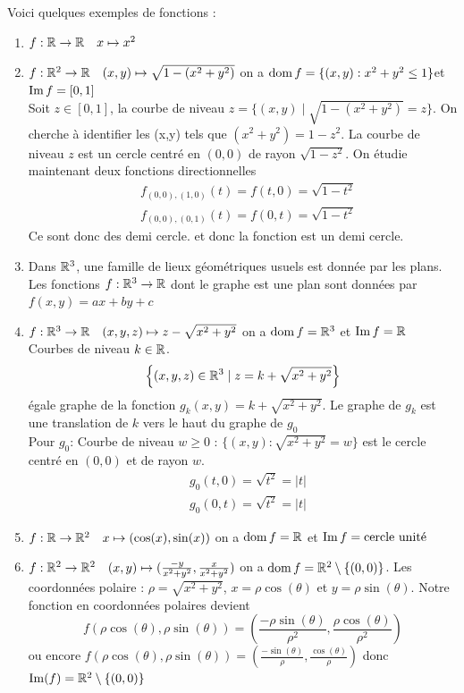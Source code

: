     \begin{exemple}
        Voici quelques exemples de fonctions :
        \begin{enumerate}
            \item $f:\mathbb{R}\to\mathbb{R} \quad x\mapsto x^2$
            \item $f:\mathbb{R}^2\to \mathbb{R} \quad (x,y)\mapsto \sqrt{1-(x^2+y^2)}$ on a $\operatorname{dom} f = \{(x,y):x^2+y^2 \leq 1\}$et $\operatorname{Im} f = [0,1]$\\
            Soit $z\in [0,1]$, la courbe de niveau $z = \{(x,y)\mid \sqrt{1-(x^2+y^2)}=z\}$. On cherche à identifier les (x,y) tels que $(x^2+y^2)=1-z^2$. La courbe de niveau $z$ est un cercle centré en $(0,0)$ de rayon $\sqrt{1-z^2}$. On étudie maintenant deux fonctions directionnelles 
            \begin{align*}
                &f_{(0,0),(1,0)}(t)= f(t,0)=\sqrt{1-t^2}\\
                &f_{(0,0),(0,1)}(t) = f(0,t)=\sqrt{1-t^2}
            \end{align*}
            Ce sont donc des demi cercle. et donc la fonction est un demi cercle.
            \item Dans $\mathbb{R}^3$, une famille de lieux géométriques usuels est donnée par les plans. Les fonctions $f:\mathbb{R}^3\to \mathbb{R}$ dont le graphe est une plan sont données par $f(x,y)=ax+by+c$
            \item $f:\mathbb{R}^3\to\mathbb{R} \quad (x,y,z)\mapsto z-\sqrt{x^2+y^2}$ on a $\operatorname{dom} f = \mathbb{R}^3$ et $\operatorname{Im} f = \mathbb{R}$\\
            Courbes de niveau $k\in\mathbb{R}$.
            \[
            \left\{(x,y,z)\in \mathbb{R}^3\mid z=k+\sqrt{x^2+y^2}\right\}
            \]
            égale graphe de la fonction $g_k(x,y)=k+\sqrt{x^
            2+y^2}$. Le graphe de $g_k$ est une translation de $k$ vers le haut du graphe de $g_0$\\
            Pour $g_0$: Courbe de niveau $w\geq 0$ : $\{(x,y):\sqrt{x^2+y^2}=w\}$ est le cercle centré en $(0,0)$ et de rayon $w$.
            \begin{align*}
                &g_0(t,0)=\sqrt{t^2}=|t|\\
                &g_0(0,t)=\sqrt{t^2}=|t|
            \end{align*}
             \item $f:\mathbb{R}\to\mathbb{R}^2 \quad x\mapsto(\cos(x),\sin(x))$ on a $\operatorname{dom} f=\mathbb{R}$ et $\operatorname{Im} f = \text{cercle unité}$
        \item $f:\mathbb{R}^2\to\mathbb{R}^2\quad (x,y)\mapsto(\frac{-y}{x^2+y^2},\frac{x}{x^2+y^2})$ on a $\operatorname{dom} f=\mathbb{R}^2\setminus\{(0,0)\}$. Les coordonnées polaire : $\rho = \sqrt{x^2+y^2}$, $x=\rho\cos(\theta)$ et $y=\rho\sin(\theta)$. Notre fonction en coordonnées polaires devient
        \begin{equation*}
            f(\rho\cos(\theta),\rho\sin(\theta))=\left(\frac{-\rho\sin(\theta)}{\rho^2},\frac{\rho\cos(\theta)}{\rho^2}\right)
        \end{equation*}
        ou encore $f(\rho\cos(\theta),\rho\sin(\theta))=\left(\frac{-\sin(\theta)}{\rho},\frac{\cos(\theta)}{\rho}\right)$ donc $\operatorname{Im}(f)=\mathbb{R}^2\setminus\{(0,0)\}$
        \end{enumerate}
    \end{exemple}